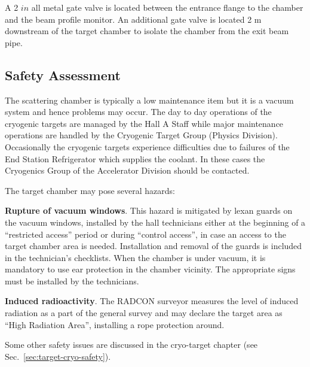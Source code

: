 {{A 2 $in$ all metal gate valve is located between the entrance flange to the
chamber and the beam profile monitor.   
 An additional gate valve is located 2 m downstream of the
 target chamber to isolate the chamber from the exit beam pipe.
}
\begin{safetyen}{10}{15}
\section{Safety Assessment}
\end{safetyen}

The scattering chamber is typically a low maintenance item but it is a vacuum
system and hence problems may occur. The day to day operations of the cryogenic
targets are managed by the Hall A Staff while major maintenance operations are
handled by the Cryogenic Target Group (Physics Division). Occasionally the
cryogenic targets experience difficulties due to failures of the End Station
Refrigerator which supplies the coolant. In these cases the Cryogenics Group
of the Accelerator Division should be contacted.

\noindent{}The target chamber may pose several hazards:

\begin{list}{.~}{\setlength{\itemsep}{-0.15cm}}
  \item {\bf Rupture of vacuum windows}. This hazard is mitigated by
        lexan guards on the vacuum windows, installed by the hall technicians
        either at the beginning of a ``restricted access'' period 
        or during ``control access'', in case an access to the target chamber area is needed.
        Installation and removal of the guards is included in the technician's checklists.
        When the chamber is under vacuum, it is mandatory to use ear protection in the chamber
        vicinity. The appropriate signs must be installed by the technicians. 

  \item {\bf Induced radioactivity}. The RADCON surveyor measures the level of induced
        radiation as a part of the general survey and may declare the target area 
        as ``High Radiation Area'', installing a rope protection around\cite{RWIcebaf}. 

\end{list}

Some other safety issues are discussed in the cryo-target chapter 
(see Sec.~\ref{sec:target-cryo-safety}).

}
